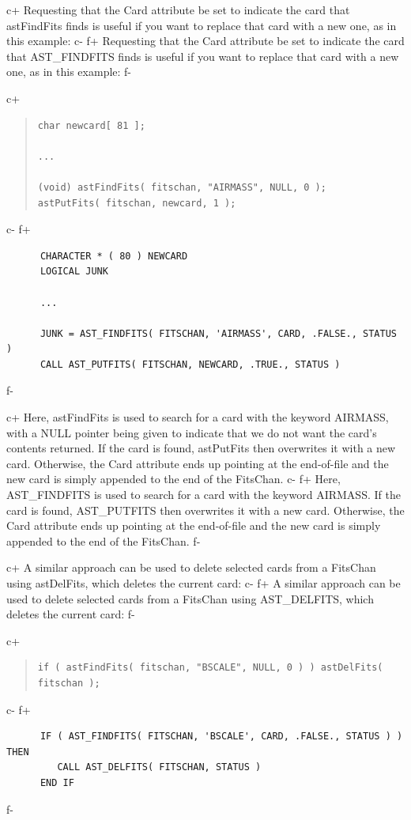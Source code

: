 \documentclass[twoside,11pt]{article}
\begin{document}
c+
Requesting that the Card attribute be set to indicate the card that
astFindFits finds is useful if you want to replace that card with a
new one, as in this example:
c-
f+
Requesting that the Card attribute be set to indicate the card that
AST\_FINDFITS finds is useful if you want to replace that card with a
new one, as in this example:
f-

c+
\begin{quote}
\small
\begin{verbatim}
char newcard[ 81 ];

...

(void) astFindFits( fitschan, "AIRMASS", NULL, 0 );
astPutFits( fitschan, newcard, 1 );
\end{verbatim}
\normalsize
\end{quote}
c-
f+
\small
\begin{verbatim}
      CHARACTER * ( 80 ) NEWCARD
      LOGICAL JUNK

      ...

      JUNK = AST_FINDFITS( FITSCHAN, 'AIRMASS', CARD, .FALSE., STATUS )
      CALL AST_PUTFITS( FITSCHAN, NEWCARD, .TRUE., STATUS )
\end{verbatim}
\normalsize
f-

c+
Here, astFindFits is used to search for a card with the keyword
AIRMASS, with a NULL pointer being given to indicate that we do not
want the card's contents returned. If the card is found, astPutFits
then overwrites it with a new card.  Otherwise, the Card attribute
ends up pointing at the end-of-file and the new card is simply
appended to the end of the FitsChan.
c-
f+
Here, AST\_FINDFITS is used to search for a card with the keyword
AIRMASS. If the card is found, AST\_PUTFITS then overwrites it with a
new card.  Otherwise, the Card attribute ends up pointing at the
end-of-file and the new card is simply appended to the end of the
FitsChan.
f-

c+
A similar approach can be used to delete selected cards from a
FitsChan using astDelFits, which deletes the current card:
c-
f+
A similar approach can be used to delete selected cards from a
FitsChan using AST\_DELFITS, which deletes the current card:
f-

c+
\begin{quote}
\small
\begin{verbatim}
if ( astFindFits( fitschan, "BSCALE", NULL, 0 ) ) astDelFits( fitschan );
\end{verbatim}
\normalsize
\end{quote}
c-
f+
\small
\begin{verbatim}
      IF ( AST_FINDFITS( FITSCHAN, 'BSCALE', CARD, .FALSE., STATUS ) ) THEN
         CALL AST_DELFITS( FITSCHAN, STATUS )
      END IF
\end{verbatim}
\normalsize
f-
\end{document}
